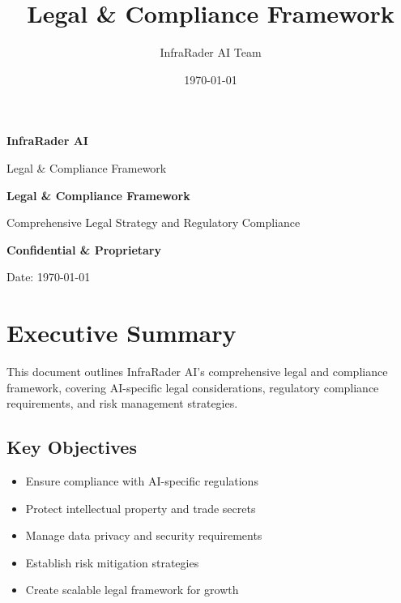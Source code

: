 \documentclass[business]{../templates/infraradar-main}
\title{Legal \& Compliance Framework}
\author{InfraRader AI Team}
\date{\today}
\begin{document}
\begin{titlepage}
    \centering
    \vspace*{2cm}
    
    {\Huge\bfseries\color{infraradar@primary} InfraRader AI\par}
    \vspace{0.5cm}
    {\Large\color{infraradar@text} Legal \& Compliance Framework\par}
    \vspace{2cm}
    
    {\huge\bfseries Legal \& Compliance Framework\par}
    \vspace{1cm}
    
    {\large Comprehensive Legal Strategy and Regulatory Compliance\par}
    \vspace{2cm}
    
    {\large\bfseries\color{infraradar@primary} Confidential \& Proprietary\par}
    {\large Date: \today\par}
    
\end{titlepage}

\tableofcontents
\newpage

\section{Executive Summary}

This document outlines InfraRader AI's comprehensive legal and compliance framework, covering AI-specific legal considerations, regulatory compliance requirements, and risk management strategies.

\subsection{Key Objectives}
\begin{itemize}
    \item Ensure compliance with AI-specific regulations
    \item Protect intellectual property and trade secrets
    \item Manage data privacy and security requirements
    \item Establish risk mitigation strategies
    \item Create scalable legal framework for growth
\end{itemize}
\end{document}
